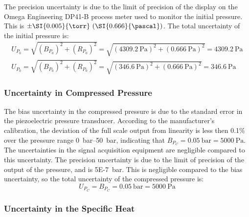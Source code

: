 \documentclass[../main.tex]{subfiles}
\begin{document}
The precision uncertainty is due to the limit of precision of the display
on the Omega Engineering DP41-B process meter used to monitor the initial
pressure. This is $\pm\SI{0.005}{\torr} \ (\SI{0.666}{\pascal})$. The total
uncertainty of the initial pressure is:
%
\begin{subequations}
\begin{align}
U_{P_0} = \sqrt{\left(B_{P_0}\right)^2 + \left(R_{P_0}\right)^2} = \sqrt{\left(\SI{4309.2}{\pascal}\right)^2 + \left(\SI{0.666}{\pascal}\right)^2} = \SI{4309.2}{\pascal} \\
U_{P_0} = \sqrt{\left(B_{P_0}\right)^2 + \left(R_{P_0}\right)^2} = \sqrt{\left(\SI{346.6}{\pascal}\right)^2 + \left(\SI{0.666}{\pascal}\right)^2} = \SI{346.6}{\pascal}
\end{align}
\end{subequations}

\subsubsection{Uncertainty in Compressed Pressure}

The bias uncertainty in the compressed pressure is due to the standard
error in the piezoelectric pressure transducer. According to the
manufacturer's calibration, the deviation of the full scale output from
linearity is less then 0.1\% over the pressure range \SIrange{0}{50}{\bar},
indicating that $B_{P_C}=\SI{0.05}{\bar}=\SI{5000}{\pascal}$.
The uncertainties in the signal acquisition equipment are negligible
compared to this uncertainty. The precision uncertainty is due to the limit
of precision of the output of the pressure, and is \SI{5E-7}{\bar}. This
is negligible compared to the bias uncertainty, so the total uncertainty
of the compressed pressure is:
%
\begin{equation}
U_{P_C} = B_{P_C} = \SI{0.05}{\bar} = \SI{5000}{\pascal}
\end{equation}

\subsubsection{Uncertainty in the Specific Heat}
\label{sec:unc-cp}
\end{document}
